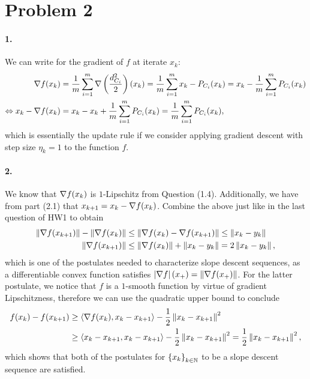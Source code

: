 \documentclass[10pt]{article}
\begin{document}
\section*{Problem 2}
\paragraph{1.}
We can write for the gradient of $f$ at iterate $x_k$:
\begin{align*}
    \nabla f(x_k) &= \frac{1}{m} \sum_{i=1}^{m} \nabla \left(
    \frac{d^2_{C_i}}{2} \right)(x_k) = \frac{1}{m} \sum_{i=1}^m x_k -
    P_{C_i}(x_k) = x_k - \frac{1}{m} \sum_{i=1}^m P_{C_i}(x_k) \\
    \Leftrightarrow
    x_k - \nabla f(x_k) &= x_k - x_k + \frac{1}{m} \sum_{i=1}^m P_{C_i}(x_k)
        = \frac{1}{m} \sum_{i=1}^m P_{C_i}(x_k),
\end{align*}
which is essentially the update rule if we consider applying gradient descent
with step size $\eta_k = 1$ to the function $f$.

\paragraph{2.}
We know that $\nabla f(x_k)$ is $1$-Lipschitz from Question (1.4).
Additionally, we have from part (2.1) that $x_{k+1} = x_k - \nabla f(x_k)$.
Combine the above just like in the last question of HW1 to obtain
\begin{align*}
    \left \| \nabla f(x_{k+1}) \right \| - \left \| \nabla f(x_k) \right \| &\leq
    \left \| \nabla f(x_k) - \nabla f(x_{k+1}) \right \| \leq \left \| x_k - y_k \right \| \\
    \left \| \nabla f(x_{k+1}) \right \| &\leq \left \| \nabla f(x_k) \right \| + \left \| x_k - y_k \right \|
        = 2 \left \| x_k - y_k \right \|,
\end{align*}
which is one of the postulates needed to characterize slope descent sequences,
as a differentiable convex function satisfies $\left| \nabla f \right|(x_+) =
\left \| \nabla f(x_+) \right \|$. For the latter postulate, we notice that $f$ is a
$1$-smooth function by virtue of gradient Lipschitzness, therefore we can
use the quadratic upper bound to conclude
\begin{align*}
    f(x_k) - f(x_{k+1}) &\geq \left\langle \nabla f(x_{k}), x_k - x_{k+1} \right\rangle - \frac{1}{2}
    \left \| x_k - x_{k+1} \right \|^2 \\
    &\geq \left\langle x_k - x_{k+1}, x_k - x_{k+1} \right\rangle - \frac{1}{2} \left \| x_k - x_{k+1} \right \|^2
    = \frac{1}{2} \left \| x_k - x_{k+1} \right \|^2,
\end{align*}
which shows that both of the postulates for $\left\{ x_k \right\}_{k \in \mathbb{N}}$ to be a
slope descent sequence are satisfied.
\end{document}
